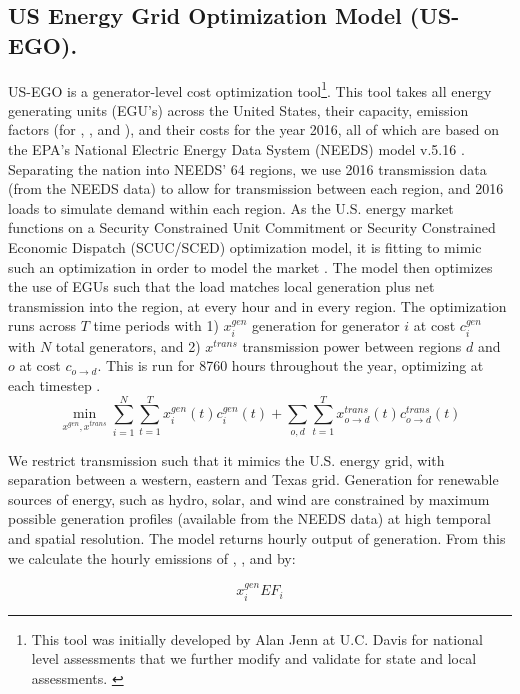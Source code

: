 \documentclass[journal=jacsat,manuscript=article]{achemso}
\begin{document}
\subsection{US Energy Grid Optimization Model (US-EGO).}
US-EGO is a generator-level cost optimization tool\footnote{This tool was initially developed by Alan Jenn at U.C. Davis for national level assessments that we further modify and validate for state and local assessments. \citep{jenn_future_2018}}. This tool takes all energy generating units (EGU's) across the United States, their capacity, emission factors (for , , and ), and their costs for the year 2016, all of which are based on the EPA's National Electric Energy Data System (NEEDS) model v.5.16 \citep{epa_power_2016}. Separating the nation into NEEDS' 64 regions, we use 2016 transmission data (from the NEEDS data) to allow for transmission between each region, and 2016 loads to simulate demand within each region. As the U.S. energy market functions on a Security Constrained Unit Commitment or Security Constrained Economic Dispatch (SCUC/SCED) optimization model, it is fitting to mimic such an optimization in order to model the market \citep{ela_evolution_2014}. The model then optimizes the use of EGUs such that the load matches local generation plus net transmission into the region, at every hour and in every region. The optimization runs across $T$ time periods with 1) $x^{gen}_{i}$ generation for generator $i$ at cost $c^{gen}_{i}$ with $N$ total generators, and 2) $x^{trans}$ transmission power between regions $d$ and $o$ at cost $c_{o\rightarrow{}d}$. This is run for 8760 hours throughout the year, optimizing at each timestep \citep{jenn_future_2018}.
\begin{equation}
    \min\limits_{x^{gen}, x^{trans}}\sum_{i=1}^{N}\sum_{t=1}^{T} x^{gen}_{i}(t) c^{gen}_{i}(t) + \sum_{o,d}\sum_{t=1}^{T} x^{trans}_{o\rightarrow{}d}(t) c^{trans}_{o\rightarrow{}d}(t)
\end{equation}

We restrict transmission such that it mimics the U.S. energy grid, with separation between a western, eastern and Texas grid. Generation for renewable sources of energy, such as hydro, solar, and wind are constrained by maximum possible generation profiles (available from the NEEDS data) at high temporal and spatial resolution. 
The model returns hourly output of generation. From this we calculate the hourly emissions of , , and  by:

\begin{equation}
    x^{gen}_{i}EF_i
\end{equation}
\end{document}
